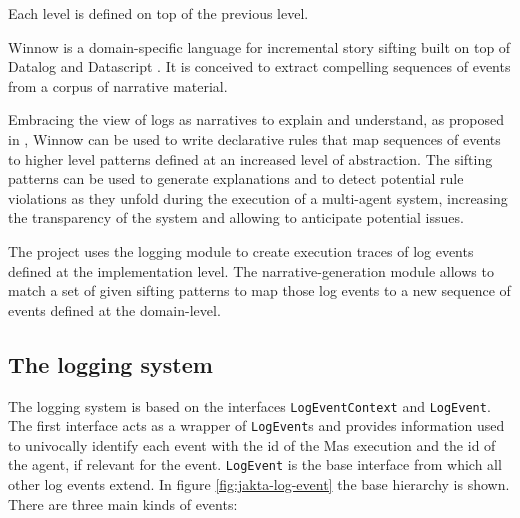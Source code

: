 \documentclass{scrartcl}
\begin{document}
Each level is defined on top of the previous level.

Winnow is a domain-specific language for incremental story sifting built on top of Datalog and
Datascript \cite{DBLP:conf/aiide/KreminskiDM21}.
%
It is conceived to extract compelling sequences of events from a corpus of narrative material. 

Embracing the view of logs as narratives to explain and understand, as
proposed in \cite{DBLP:journals/aamas/YanBHR25}, Winnow can be used to write declarative rules that map sequences of events to higher level patterns defined at an increased level of abstraction.
%
The sifting patterns can be used to generate explanations and to detect potential rule violations
as they unfold during the execution of a multi-agent system, increasing the transparency of
the system and allowing to anticipate potential issues.

The project uses the logging module to create execution traces of log events defined at the implementation level. 
%
The narrative-generation module allows to match a set of given sifting patterns to map those log events to a new sequence of events defined at the domain-level.

\subsection{The logging system}

The logging system is based on the interfaces \verb|LogEventContext| and \verb|LogEvent|.
%
The first interface acts as a wrapper of \verb|LogEvent|s and provides information used to univocally identify each event with the id of the Mas execution and the id of the agent, if relevant for the event.
%
\verb|LogEvent| is the base interface from which all other log events extend. In figure \ref{fig:jakta-log-event} the base hierarchy is shown. There are three main kinds of events:
\end{document}
